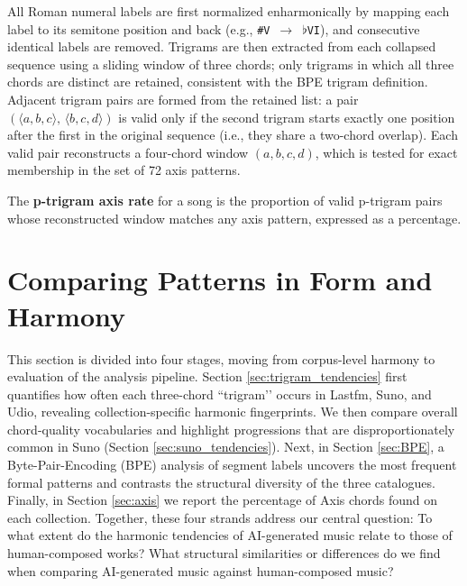 \documentclass{article}
\begin{document}
All Roman numeral labels are first normalized enharmonically by mapping each label to its semitone position and back (e.g., \texttt{\#V}~$\rightarrow$~$\flat$\texttt{VI}), and consecutive identical labels are removed. Trigrams are then extracted from each collapsed sequence using a sliding window of three chords; only trigrams in which all three chords are distinct are retained, consistent with the BPE trigram definition. Adjacent trigram pairs are formed from the retained list: a pair $(\langle a,b,c \rangle,\, \langle b,c,d \rangle)$ is valid only if the second trigram starts exactly one position after the first in the original sequence (i.e., they share a two-chord overlap). Each valid pair reconstructs a four-chord window $(a, b, c, d)$, which is tested for exact membership in the set of 72 axis patterns.

The \textbf{p-trigram axis rate} for a song is the proportion of valid p-trigram pairs whose reconstructed window matches any axis pattern, expressed as a percentage. 


\section{Comparing Patterns in Form and Harmony}
\label{sec:trigram_comparisons}
This section is divided into four stages, moving from corpus-level harmony to evaluation of the analysis pipeline. Section \ref{sec:trigram_tendencies} first quantifies how often each three-chord “trigram’’ occurs in Lastfm, Suno, and Udio, revealing collection-specific harmonic fingerprints. We then compare overall chord-quality vocabularies and highlight progressions that are disproportionately common in Suno (Section \ref{sec:suno_tendencies}). Next, in Section \ref{sec:BPE}, a Byte-Pair-Encoding (BPE) analysis of segment labels uncovers the most frequent formal patterns and contrasts the structural diversity of the three catalogues. Finally, in Section \ref{sec:axis} we report the percentage of Axis chords found on each collection. Together, these four strands address our central question: To what extent do the harmonic tendencies of AI-generated music relate to those of human-composed works? What structural similarities or differences do we find when comparing AI-generated music against human-composed music?

\end{document}

